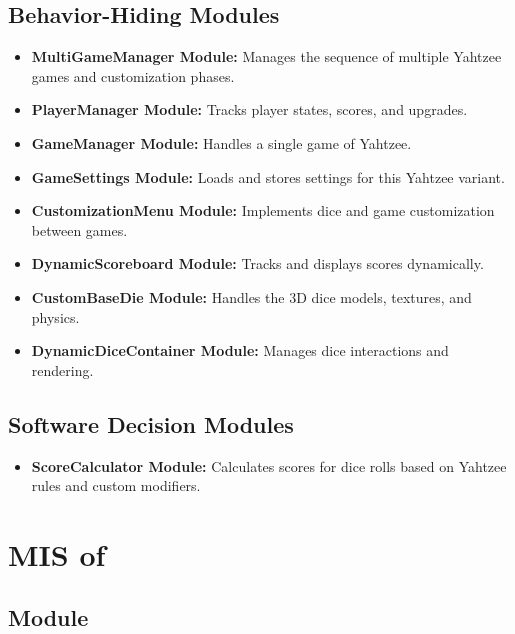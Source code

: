 \documentclass[12pt, titlepage]{article}
\begin{document}
\subsection{Behavior-Hiding Modules}
\begin{itemize}
    \item \textbf{MultiGameManager Module:} Manages the sequence of multiple Yahtzee games and customization phases.
    \item \textbf{PlayerManager Module:} Tracks player states, scores, and upgrades.
    \item \textbf{GameManager Module:} Handles a single game of Yahtzee.
    \item \textbf{GameSettings Module:} Loads and stores settings for this Yahtzee variant.
    \item \textbf{CustomizationMenu Module:} Implements dice and game customization between games.
    \item \textbf{DynamicScoreboard Module:} Tracks and displays scores dynamically.
    \item \textbf{CustomBaseDie Module:} Handles the 3D dice models, textures, and physics.
    \item \textbf{DynamicDiceContainer Module:} Manages dice interactions and rendering.
\end{itemize}

\subsection{Software Decision Modules}
\begin{itemize}
    \item \textbf{ScoreCalculator Module:} Calculates scores for dice rolls based on Yahtzee rules and custom modifiers.
\end{itemize}

\newpage

\section{MIS of } \label{Module} 



\subsection{Module}
\end{document}
